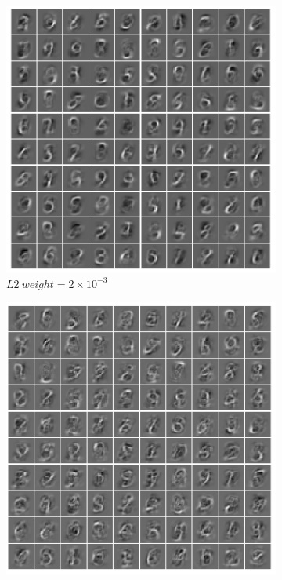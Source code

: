 \documentclass[a4paper, 10pt]{article}
\begin{document}
    \begin{figure}[htb]
      \centering
      \hfill
      \begin{subfigure}[t]{0.25\linewidth}
        \includegraphics[width=1\linewidth]{lab4/weights_default.png}
        \caption{$L2\ weight = 2 \times 10^{-3}$}
      \end{subfigure}
      \hfill
      \begin{subfigure}[t]{0.245\linewidth}
        \includegraphics[width=1\linewidth]{lab4/weights_regulariz1e-3.png}

\end{subfigure}
\end{figure}
\end{document}
